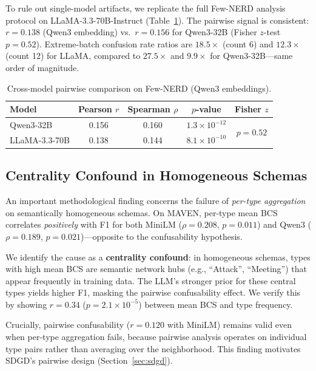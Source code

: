 \documentclass[11pt,a4paper]{article}
\begin{document}
To rule out single-model artifacts, we replicate the full Few-NERD analysis protocol on LLaMA-3.3-70B-Instruct (Table~\ref{tab:cross-model}).
The pairwise signal is consistent: $r{=}0.138$ (Qwen3 embedding) vs.\ $r{=}0.156$ for Qwen3-32B (Fisher $z$-test $p{=}0.52$).
Extreme-batch confusion rate ratios are $18.5\times$ (count 6) and $12.3\times$ (count 12) for LLaMA, compared to $27.5\times$ and $9.9\times$ for Qwen3-32B---same order of magnitude.

\begin{table}[t]
\centering
\small
\caption{Cross-model pairwise comparison on Few-NERD (Qwen3 embeddings).}
\label{tab:cross-model}
\begin{tabular}{lcccc}
\toprule
Model & Pearson $r$ & Spearman $\rho$ & $p$-value & Fisher $z$ \\
\midrule
Qwen3-32B     & 0.156 & 0.160 & $1.3{\times}10^{-12}$ & \multirow{2}{*}{$p{=}0.52$} \\
LLaMA-3.3-70B & 0.138 & 0.144 & $8.1{\times}10^{-10}$ & \\
\bottomrule
\end{tabular}
\end{table}


\subsection{Centrality Confound in Homogeneous Schemas}
\label{sec:centrality}

An important methodological finding concerns the failure of \emph{per-type aggregation} on semantically homogeneous schemas.
On MAVEN, per-type mean BCS correlates \emph{positively} with F1 for both MiniLM ($\rho{=}0.208$, $p{=}0.011$) and Qwen3 ($\rho{=}0.189$, $p{=}0.021$)---opposite to the confusability hypothesis.

We identify the cause as a \textbf{centrality confound}: in homogeneous schemas, types with high mean BCS are semantic network hubs (e.g., ``Attack'', ``Meeting'') that appear frequently in training data.
The LLM's stronger prior for these central types yields higher F1, masking the pairwise confusability effect.
We verify this by showing $r{=}0.34$ ($p{=}2.1{\times}10^{-5}$) between mean BCS and type frequency.

Crucially, pairwise confusability ($r{=}0.120$ with MiniLM) remains valid even when per-type aggregation fails, because pairwise analysis operates on individual type pairs rather than averaging over the neighborhood.
This finding motivates SDGD's pairwise design (Section~\ref{sec:sdgd}).
\end{document}
